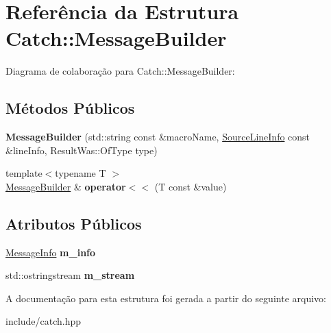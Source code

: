 \hypertarget{structCatch_1_1MessageBuilder}{}\section{Referência da Estrutura Catch\+:\+:Message\+Builder}
\label{structCatch_1_1MessageBuilder}


Diagrama de colaboração para Catch\+:\+:Message\+Builder\+:
\subsection*{Métodos Públicos}
\begin{DoxyCompactItemize}
\item 
{\bfseries Message\+Builder} (std\+::string const \&macro\+Name, \hyperlink{structCatch_1_1SourceLineInfo}{Source\+Line\+Info} const \&line\+Info, Result\+Was\+::\+Of\+Type type)\hypertarget{structCatch_1_1MessageBuilder_ab0c6378e722680bf58852c6ee2b6e724}{}\label{structCatch_1_1MessageBuilder_ab0c6378e722680bf58852c6ee2b6e724}

\item 
{\footnotesize template$<$typename T $>$ }\\\hyperlink{structCatch_1_1MessageBuilder}{Message\+Builder} \& {\bfseries operator$<$$<$} (T const \&value)\hypertarget{structCatch_1_1MessageBuilder_a20fa48d069b20dddcc2d3df8abb123c1}{}\label{structCatch_1_1MessageBuilder_a20fa48d069b20dddcc2d3df8abb123c1}

\end{DoxyCompactItemize}
\subsection*{Atributos Públicos}
\begin{DoxyCompactItemize}
\item 
\hyperlink{structCatch_1_1MessageInfo}{Message\+Info} {\bfseries m\+\_\+info}\hypertarget{structCatch_1_1MessageBuilder_a979f1c2b36d78f80ee275bfa5ba0209f}{}\label{structCatch_1_1MessageBuilder_a979f1c2b36d78f80ee275bfa5ba0209f}

\item 
std\+::ostringstream {\bfseries m\+\_\+stream}\hypertarget{structCatch_1_1MessageBuilder_a6488ab0cc4ea52affc9c0612c7c5df6b}{}\label{structCatch_1_1MessageBuilder_a6488ab0cc4ea52affc9c0612c7c5df6b}

\end{DoxyCompactItemize}


A documentação para esta estrutura foi gerada a partir do seguinte arquivo\+:\begin{DoxyCompactItemize}
\item 
include/catch.\+hpp\end{DoxyCompactItemize}
